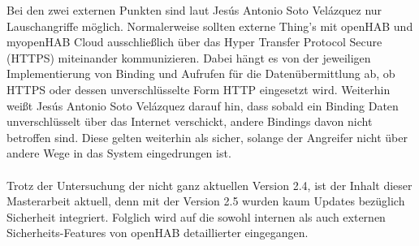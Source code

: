 Bei den zwei externen Punkten sind laut 
Jesús Antonio Soto Velázquez nur Lauschangriffe möglich. Normalerweise sollten externe Thing's mit openHAB und myopenHAB Cloud ausschließlich über das Hyper Transfer Protocol Secure (HTTPS) miteinander kommunizieren. Dabei hängt es von der jeweiligen Implementierung von Binding und Aufrufen für die Datenübermittlung ab, ob HTTPS oder dessen unverschlüsselte Form HTTP eingesetzt wird. Weiterhin weißt Jesús Antonio Soto Velázquez darauf hin, dass sobald ein Binding Daten unverschlüsselt über das Internet verschickt, andere Bindings davon nicht betroffen sind. Diese gelten weiterhin als sicher, solange der Angreifer nicht über andere Wege in das System eingedrungen ist.\\
\\
Trotz der Untersuchung der nicht ganz aktuellen Version 2.4, ist der Inhalt dieser Masterarbeit aktuell, denn mit der Version 2.5 wurden kaum Updates bezüglich Sicherheit integriert.\cite{openHAB02:OH} Folglich wird auf die sowohl internen als auch externen Sicherheits-Features von openHAB detaillierter eingegangen.

